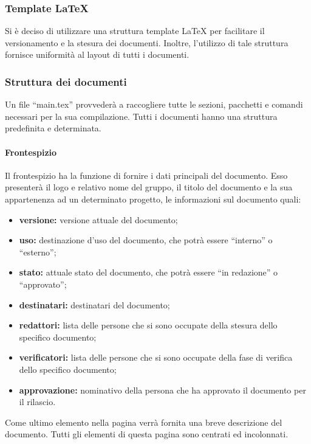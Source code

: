 		\subsubsection{Template LaTeX}
			Si è deciso di utilizzare una struttura template \LaTeX{} per facilitare il versionamento e la stesura dei documenti. Inoltre, l'utilizzo di tale struttura fornisce uniformità al layout di tutti i documenti.
		\subsubsection{Struttura dei documenti}
			Un file ``main.tex'' provvederà a raccogliere tutte le sezioni, pacchetti e comandi necessari per la sua compilazione. Tutti i documenti hanno una struttura predefinita e determinata.
			\paragraph{Frontespizio}
				Il frontespizio ha la funzione di fornire i dati principali del documento. Esso presenterà il logo e relativo nome del gruppo, il titolo del documento e la sua appartenenza ad un determinato progetto, le informazioni sul documento quali:
				\begin{itemize}
					\item \textbf{versione:} versione attuale del documento;
					\item \textbf{uso:} destinazione d'uso del documento, che potrà essere ``interno'' o ``esterno'';
					\item \textbf{stato:} attuale stato del documento, che potrà essere ``in redazione'' o ``approvato'';
					\item \textbf{destinatari:} destinatari del documento;
					\item \textbf{redattori:} lista delle persone che si sono occupate della stesura dello specifico documento;
					\item \textbf{verificatori:} lista delle persone che si sono occupate della fase di verifica dello specifico documento;
					\item \textbf{approvazione:} nominativo della persona che ha approvato il documento per il rilascio.
				\end{itemize}
				Come ultimo elemento nella pagina verrà fornita una breve descrizione del documento. Tutti gli elementi di questa pagina sono centrati ed incolonnati.
